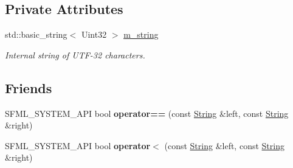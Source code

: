 \subsection*{Private Attributes}
\begin{DoxyCompactItemize}
\item 
\mbox{\label{classsf_1_1_string_ac31f912a1ff7315ed52ddab1b8ac0c98}} 
std\+::basic\+\_\+string$<$ Uint32 $>$ \mbox{\hyperlink{classsf_1_1_string_ac31f912a1ff7315ed52ddab1b8ac0c98}{m\+\_\+string}}
\begin{DoxyCompactList}\small\item\em Internal string of U\+T\+F-\/32 characters. \end{DoxyCompactList}\end{DoxyCompactItemize}
\subsection*{Friends}
\begin{DoxyCompactItemize}
\item 
\mbox{\label{classsf_1_1_string_a2a385459fa9a237e61a712fa956d489e}} 
S\+F\+M\+L\+\_\+\+S\+Y\+S\+T\+E\+M\+\_\+\+A\+PI bool {\bfseries operator==} (const \mbox{\hyperlink{classsf_1_1_string}{String}} \&left, const \mbox{\hyperlink{classsf_1_1_string}{String}} \&right)
\item 
\mbox{\label{classsf_1_1_string_ac2ca5a7703402a2bbafd85eec6d1e846}} 
S\+F\+M\+L\+\_\+\+S\+Y\+S\+T\+E\+M\+\_\+\+A\+PI bool {\bfseries operator$<$} (const \mbox{\hyperlink{classsf_1_1_string}{String}} \&left, const \mbox{\hyperlink{classsf_1_1_string}{String}} \&right)
\end{DoxyCompactItemize}

